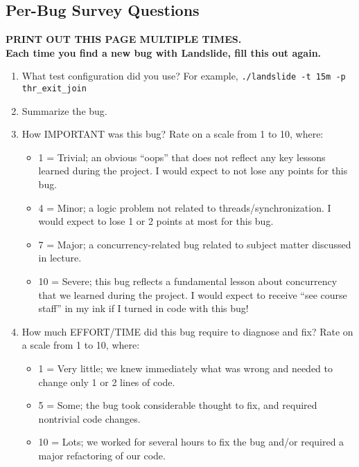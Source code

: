 \documentclass{article}
\begin{document}
\newpage
\subsection{Per-Bug Survey Questions}
\begin{center}
{\bf \large PRINT OUT THIS PAGE MULTIPLE TIMES.
\\

Each time you find a new bug with Landslide, fill this out again.}
\end{center}

\begin{enumerate}
	\item What test configuration did you use? For example, {\tt ./landslide -t 15m -p thr\_exit\_join}
		\vspace{0.5in}
	\item Summarize the bug.
		\vspace{0.5in}
	\item How IMPORTANT was this bug? Rate on a scale from 1 to 10, where:
		\begin{itemize}
			\item 1 = Trivial; an obvious ``oops'' that does not reflect any key lessons learned during the project. I would expect to not lose any points for this bug.
			\item 4 = Minor; a logic problem not related to threads/synchronization. I would expect to lose 1 or 2 points at most for this bug.
			\item 7 = Major; a concurrency-related bug related to subject matter discussed in lecture.
			\item 10 = Severe; this bug reflects a fundamental lesson about concurrency that we learned during the project. I would expect to receive ``see course staff'' in my ink if I turned in code with this bug!
		\end{itemize}
		\vspace{0.5in}
	\item How much EFFORT/TIME did this bug require to diagnose and fix? Rate on a scale from 1 to 10, where:
		\begin{itemize}
			\item 1 = Very little; we knew immediately what was wrong and needed to change only 1 or 2 lines of code.
			\item 5 = Some; the bug took considerable thought to fix, and required nontrivial code changes.
			\item 10 = Lots; we worked for several hours to fix the bug and/or required a major refactoring of our code.

\end{itemize}
\end{enumerate}
\end{document}
